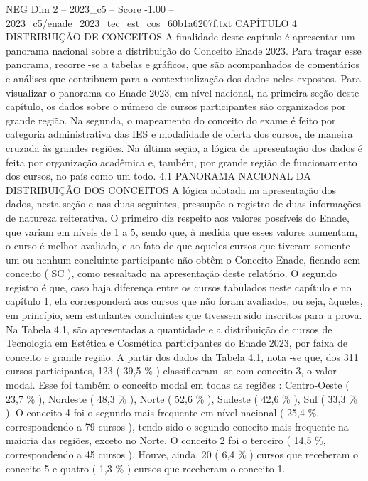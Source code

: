 \begin{textsample}{NEG Dim 2 – 2023\_c5 – Score -1.00 – 2023\_c5/enade\_2023\_tec\_est\_cos\_60b1a6207f.txt}  \label{ex:f2_neg_178}
CAPÍTULO 4 DISTRIBUIÇÃO DE CONCEITOS A finalidade deste capítulo é apresentar um panorama nacional sobre a distribuição do Conceito Enade 2023.
Para traçar esse panorama, recorre -se a tabelas e gráficos, que são acompanhados de comentários e análises que contribuem para a contextualização dos dados neles expostos.
Para visualizar o panorama do Enade 2023, em nível nacional, na primeira seção deste capítulo, os dados sobre o número de cursos participantes são organizados por grande região.
Na segunda, o mapeamento do conceito do exame é feito por categoria administrativa das IES e modalidade de oferta dos cursos, de maneira cruzada às grandes regiões.
Na última seção, a lógica de apresentação dos dados é feita por organização acadêmica e, também, por grande região de funcionamento dos cursos, no país como um todo. 4.1 PANORAMA NACIONAL DA DISTRIBUIÇÃO DOS CONCEITOS A lógica adotada na apresentação dos dados, nesta seção e nas duas seguintes, pressupõe o registro de duas informações de natureza reiterativa.
O primeiro diz respeito aos valores possíveis do Enade, que variam em níveis de 1 a 5, sendo que, à medida que esses valores aumentam, o curso é melhor avaliado, e ao fato de que aqueles cursos que tiveram somente um ou nenhum concluinte participante não obtêm o Conceito Enade, ficando sem conceito ( SC ), como ressaltado na apresentação deste relatório.
O segundo registro é que, caso haja diferença entre os cursos tabulados neste capítulo e no capítulo 1, ela corresponderá aos cursos que não foram avaliados, ou seja, àqueles, em princípio, sem estudantes concluintes que tivessem sido inscritos para a prova.
Na Tabela 4.1, são apresentadas a quantidade e a distribuição de cursos de Tecnologia em Estética e Cosmética participantes do Enade 2023, por faixa de conceito e grande região.
A partir dos dados da Tabela 4.1, nota -se que, dos 311 cursos participantes, 123 ( 39,5 \% ) classificaram -se com conceito 3, o valor modal.
Esse foi também o conceito modal em todas as regiões : Centro-Oeste ( 23,7 \% ), Nordeste ( 48,3 \% ), Norte ( 52,6 \% ), Sudeste ( 42,6 \% ), Sul ( 33,3 \% ).
O conceito 4 foi o segundo mais frequente em nível nacional ( 25,4 \%, correspondendo a 79 cursos ), tendo sido o segundo conceito mais frequente na maioria das regiões, exceto no Norte.
O conceito 2 foi o terceiro ( 14,5 \%, correspondendo a 45 cursos ).
Houve, ainda, 20 ( 6,4 \% ) cursos que receberam o conceito 5 e quatro ( 1,3 \% ) cursos que receberam o conceito 1.

\end{textsample}
